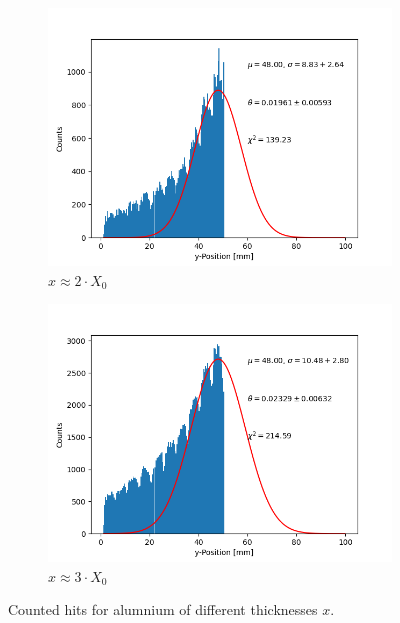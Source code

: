 \documentclass[sn-mathphys-num,iicol]{sn-jnl}
\theoremstyle{thmstyleone}
\theoremstyle{thmstyletwo}
\theoremstyle{thmstylethree}
\begin{document}
\begin{figure}[h]
\begin{subfigure}{0.49\textwidth}
        \includegraphics[width=\textwidth]{../src/elsa/finished_plots/Aluminium, Two Radiation Lengths, 40cm Distance.png}
        \caption{$x\approx2\cdot X_0$}
    \end{subfigure}
    \begin{subfigure}{0.49\textwidth}
        \includegraphics[width=\textwidth]{../src/elsa/finished_plots/Aluminium, Three Radiation Lengths, 40cm Distance.png}
        \caption{$x\approx3\cdot X_0$}
    \end{subfigure}
    \caption{Counted hits for alumnium of different thicknesses $x$.}
    \label{fig:alu_gaus}
\end{figure}
\end{document}
